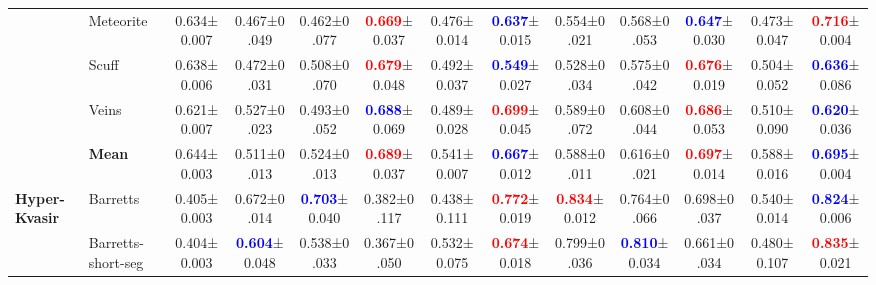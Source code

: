 \documentclass[10pt,twocolumn,letterpaper]{article}
\begin{document}
\begin{table*}[bt]
{\begin{tabular}{l@{}l@{}|c||ccccc||ccccc}
          & Meteorite & 0.634\footnotesize{±0.007}& 0.467\footnotesize{±0.049}& 0.462\footnotesize{±0.077}& \textcolor{red}{\textbf{0.669}}\footnotesize{±0.037}& 0.476\footnotesize{±0.014}& \textcolor{blue}{\textbf{0.637}}\footnotesize{±0.015}& 0.554\footnotesize{±0.021}& 0.568\footnotesize{±0.053}& \textcolor{blue}{\textbf{0.647}}\footnotesize{±0.030}& 0.473\footnotesize{±0.047}& \textcolor{red}{\textbf{0.716}}\footnotesize{±0.004} \\
          & Scuff & 0.638\footnotesize{±0.006}& 0.472\footnotesize{±0.031}& 0.508\footnotesize{±0.070}& \textcolor{red}{\textbf{0.679}}\footnotesize{±0.048}& 0.492\footnotesize{±0.037}& \textcolor{blue}{\textbf{0.549}}\footnotesize{±0.027}& 0.528\footnotesize{±0.034}& 0.575\footnotesize{±0.042}& \textcolor{red}{\textbf{0.676}}\footnotesize{±0.019}& 0.504\footnotesize{±0.052}& \textcolor{blue}{\textbf{0.636}}\footnotesize{±0.086} \\
          & Veins & 0.621\footnotesize{±0.007}& 0.527\footnotesize{±0.023}& 0.493\footnotesize{±0.052}& \textcolor{blue}{\textbf{0.688}}\footnotesize{±0.069}& 0.489\footnotesize{±0.028}& \textcolor{red}{\textbf{0.699}}\footnotesize{±0.045}& 0.589\footnotesize{±0.072}& 0.608\footnotesize{±0.044}& \textcolor{red}{\textbf{0.686}}\footnotesize{±0.053}& 0.510\footnotesize{±0.090}& \textcolor{blue}{\textbf{0.620}}\footnotesize{±0.036} \\
          \cline{2-13}
          & \textbf{Mean}  & 0.644\footnotesize{±0.003}& 0.511\footnotesize{±0.013}& 0.524\footnotesize{±0.013}& \textcolor{red}{\textbf{0.689}}\footnotesize{±0.037}& 0.541\footnotesize{±0.007}& \textcolor{blue}{\textbf{0.667}}\footnotesize{±0.012}& 0.588\footnotesize{±0.011}& 0.616\footnotesize{±0.021}& \textcolor{red}{\textbf{0.697}}\footnotesize{±0.014}& 0.588\footnotesize{±0.016}& \textcolor{blue}{\textbf{0.695}}\footnotesize{±0.004}  \\
    \hline
    \multirow{5}{*}{\textbf{Hyper-Kvasir}} & Barretts & 0.405\footnotesize{±0.003}& 0.672\footnotesize{±0.014}& \textcolor{blue}{\textbf{0.703}}\footnotesize{±0.040}& 0.382\footnotesize{±0.117}& 0.438\footnotesize{±0.111}& \textcolor{red}{\textbf{0.772}}\footnotesize{±0.019}& \textcolor{red}{\textbf{0.834}}\footnotesize{±0.012}& 0.764\footnotesize{±0.066}& 0.698\footnotesize{±0.037}& 0.540\footnotesize{±0.014}& \textcolor{blue}{\textbf{0.824}}\footnotesize{±0.006} \\
          & Barretts-short-seg & 0.404\footnotesize{±0.003}& \textcolor{blue}{\textbf{0.604}}\footnotesize{±0.048}& 0.538\footnotesize{±0.033}& 0.367\footnotesize{±0.050}& 0.532\footnotesize{±0.075}& \textcolor{red}{\textbf{0.674}}\footnotesize{±0.018}& 0.799\footnotesize{±0.036}& \textcolor{blue}{\textbf{0.810}}\footnotesize{±0.034}& 0.661\footnotesize{±0.034}& 0.480\footnotesize{±0.107}& \textcolor{red}{\textbf{0.835}}\footnotesize{±0.021} \\

\end{tabular}}
\end{table*}
\end{document}
